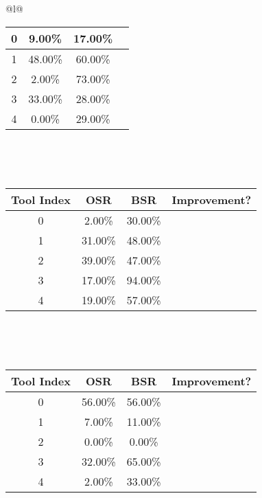 \begin{longtable}{@{}l@{}}
\begin{minipage}{\textwidth}
\begin{tabular}{|c|c|c|c|}
0 & 9.00\% & 17.00\% & \textcolor{green}{\ding{51}} \\ \hline
1 & 48.00\% & 60.00\% & \textcolor{green}{\ding{51}} \\ \hline
2 & 2.00\% & 73.00\% & \textcolor{green}{\ding{51}} \\ \hline
3 & 33.00\% & 28.00\% & \textcolor{red}{\ding{55}} \\ \hline
4 & 0.00\% & 29.00\% & \textcolor{green}{\ding{51}} \\ \hline
\end{tabular}
\end{minipage}\\[2ex]
\begin{minipage}{\textwidth}
\centering\vspace{2ex}
\\[0.8ex]
\begin{tabular}{|c|c|c|c|} \hline
\textbf{Tool Index} & \textbf{OSR} & \textbf{ BSR} & \textbf{Improvement?} \\ \hline
0 & 2.00\% & 30.00\% & \textcolor{green}{\ding{51}} \\ \hline
1 & 31.00\% & 48.00\% & \textcolor{green}{\ding{51}} \\ \hline
2 & 39.00\% & 47.00\% & \textcolor{green}{\ding{51}} \\ \hline
3 & 17.00\% & 94.00\% & \textcolor{green}{\ding{51}} \\ \hline
4 & 19.00\% & 57.00\% & \textcolor{green}{\ding{51}} \\ \hline
\end{tabular}
\end{minipage}\\[2ex]
\begin{minipage}{\textwidth}
\centering\vspace{2ex}
\\[0.8ex]
\begin{tabular}{|c|c|c|c|} \hline
\textbf{Tool Index} & \textbf{OSR} & \textbf{ BSR} & \textbf{Improvement?} \\ \hline
0 & 56.00\% & 56.00\% & \textcolor{red}{\ding{55}} \\ \hline
1 & 7.00\% & 11.00\% & \textcolor{green}{\ding{51}} \\ \hline
2 & 0.00\% & 0.00\% & \textcolor{red}{\ding{55}} \\ \hline
3 & 32.00\% & 65.00\% & \textcolor{green}{\ding{51}} \\ \hline
4 & 2.00\% & 33.00\% & \textcolor{green}{\ding{51}} \\ \hline

\end{tabular}
\end{minipage}
\end{longtable}
